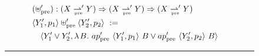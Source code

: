 \begin{figure}[!tb]
{\begin{minipage}{0.98\textwidth}
\begin{align*}
\begin{aligned}[t]
\begin{aligned}[t]
	\end{aligned} \\
\\[-6pt]
	&\begin{aligned}[t]
		&(\uplus\pre') : (X \prepto' Y) \tto (X \prepto' Y) \tto (X \prepto' Y) \\
		&\pair{Y_1',p_1} \uplus\pre' \pair{Y_2',p_2} \ := \\
		&\tab\pair{Y_1' \join Y_2',\fun{B}{ap\pre'~\pair{Y_1',p_1}~B \join ap\pre'~\pair{Y_2',p_2}~B}
		}
	\end{aligned}
\end{aligned}
\end{align*}
\vspace{3pt}
\hrule
\end{minipage}
\label{fig:approximating-preimage-mapping-defs}
}


\end{figure}
